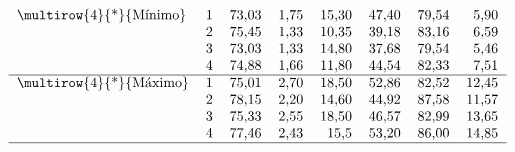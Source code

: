 \documentclass[10pt,twoside]{article}
\begin{document}
\begin{table}[!ht]
\[\begin{tabular}{lrrrrrrr}
\multirow{4}{*}{Mínimo}     & 1                          & 73,03                        & 1,75                     & 15,30                      & 47,40                   & 79,54                        & 5,90                       \\
                            & 2                          & 75,45                        & 1,33                     & 10,35                      & 39,18                   & 83,16                        & 6,59                       \\
                            & 3                          & 73,03                        & 1,33                     & 14,80                      & 37,68                   & 79,54                        & 5,46                       \\
                            & 4                          & 74,88                        & 1,66                     & 11,80                      & 44,54                   & 82,33                        & 7,51                       \\ \hline
\multirow{4}{*}{Máximo}     & 1                          & 75,01                        & 2,70                     & 18,50                       & 52,86                   & 82,52                        & 12,45                      \\
                            & 2                          & 78,15                        & 2,20                     & 14,60                       & 44,92                   & 87,58                        & 11,57                      \\
                            & 3                          & 75,33                        & 2,55                     & 18,50                       & 46,57                   & 82,99                        & 13,65                      \\
                            & 4                          & 77,46                        & 2,43                     & 15,5                       & 53,20                   & 86,00                        & 14,85                      \\ \hline
\end{tabular} \]
\end{table}
\FloatBarrier
\end{document}
